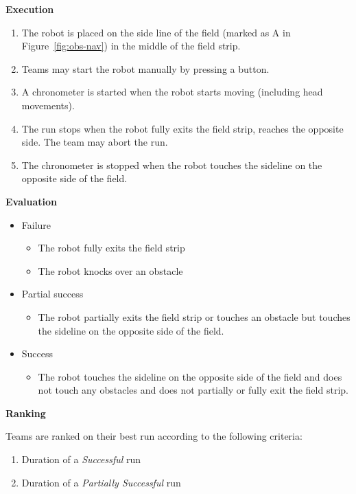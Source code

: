 \vspace{2em}
{\bfseries Execution}
\begin{enumerate}
\item The robot is placed on the side line of the field (marked as A in Figure~\ref{fig:obs-nav}) in the middle of the field strip.
\item Teams may start the robot manually by pressing a button.
\item A chronometer is started when the robot starts moving (including head movements).
\item The run stops when the robot fully exits the field strip, reaches the opposite side. The team may abort the run.
\item The chronometer is stopped when the robot touches the sideline on the opposite side of the field.

\end{enumerate}
\vspace{2em}
{\bfseries Evaluation}
\begin{itemize}
\item Failure
\begin{itemize}
\item The robot fully exits the field strip
\item The robot knocks over an obstacle
\end{itemize}
\item Partial success
\begin{itemize}
\item The robot partially exits the field strip or touches an obstacle but touches the sideline on the opposite side of the field.
\end{itemize}
\item Success
\begin{itemize}
\item The robot touches the sideline on the opposite side of the field and does not touch any obstacles and does not partially or fully exit the field strip.
\end{itemize}
\end{itemize}



\vspace{2em}
{\bfseries Ranking}

Teams are ranked on their best run according to the following criteria:
\begin{enumerate}
\item Duration of a \textit{Successful} run
\item Duration of a \textit{Partially Successful} run
\end{enumerate}





